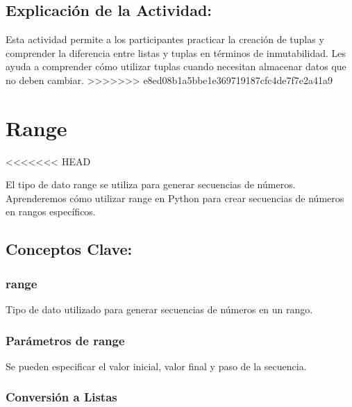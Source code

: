\documentclass[
  a4paper,
  DIV=11,
  numbers=noendperiod,
  onepage,
  openany]{scrreprt}
\begin{document}
\hypertarget{explicaciuxf3n-de-la-actividad-19}{%
\section{Explicación de la
Actividad:}\label{explicaciuxf3n-de-la-actividad-19}}

Esta actividad permite a los participantes practicar la creación de
tuplas y comprender la diferencia entre listas y tuplas en términos de
inmutabilidad. Les ayuda a comprender cómo utilizar tuplas cuando
necesitan almacenar datos que no deben cambiar.
\textgreater\textgreater\textgreater\textgreater\textgreater\textgreater\textgreater{}
e8ed08b1a5bbe1e369719187cfc4de7f7e2a41a9

\hypertarget{range}{%
\chapter{Range}\label{range}}

\textless\textless\textless\textless\textless\textless\textless{} HEAD

El tipo de dato range se utiliza para generar secuencias de números.
Aprenderemos cómo utilizar range en Python para crear secuencias de
números en rangos específicos.

\hypertarget{conceptos-clave-22}{%
\section{Conceptos Clave:}\label{conceptos-clave-22}}

\hypertarget{range-1}{%
\subsection{range}\label{range-1}}

Tipo de dato utilizado para generar secuencias de números en un rango.

\hypertarget{paruxe1metros-de-range}{%
\subsection{Parámetros de range}\label{paruxe1metros-de-range}}

Se pueden especificar el valor inicial, valor final y paso de la
secuencia.

\hypertarget{conversiuxf3n-a-listas}{%
\subsection{Conversión a Listas}\label{conversiuxf3n-a-listas}}
\end{document}
